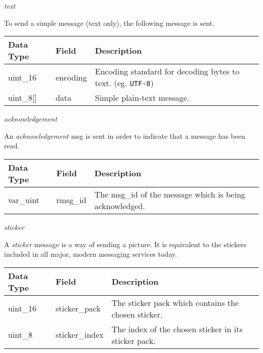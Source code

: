\documentclass{article}
\begin{document}
\begin{center}
    \large \textit{text}
\end{center}
To send a simple message (text only), the following message is sent.
\begin{table}[H]
\centering
\begin{tabular}{|p{1.3cm}|p{2.5cm}|p{6cm}|}
\hline
\rowcolor{tblgrey} 
Data Type       & Field           & Description                                               \\ \hline
uint\_16        & encoding        & Encoding standard for decoding bytes to text. (eg. \texttt{UTF-8}) \\ \hline
uint\_8[\hspace{0.05cm}] & data            & Simple plain-text message.                                \\ \hline
\end{tabular}
\end{table}

\begin{center}
    \large \textit{acknowledgement}
\end{center}
An \textit{acknowledgement} msg is sent in order to indicate that a message has been read.
\begin{table}[H]
\centering
\begin{tabular}{|p{1.3cm}|p{2.5cm}|p{6cm}|}
\hline
\rowcolor{tblgrey} 
Data Type       & Field           & Description                                               \\ \hline
var\_uint       & rmsg\_id         & The msg\_id of the message which is being acknowledged.   \\ \hline
\end{tabular}
\end{table}

\begin{center}
    \large \textit{sticker}
\end{center}
A \textit{sticker} message is a way of sending a picture. It is equivalent to the stickers included in all major, modern messaging services today.
\begin{table}[H]
\centering
\begin{tabular}{|p{1.3cm}|p{2.5cm}|p{6cm}|}
\hline
\rowcolor{tblgrey} 
Data Type       & Field           & Description                                               \\ \hline
uint\_16        & sticker\_pack   & The sticker pack which contains the chosen sticker.       \\ \hline
uint\_8         & sticker\_index  & The index of the chosen sticker in its sticker pack.      \\ \hline
\end{tabular}
\end{table}
\end{document}
